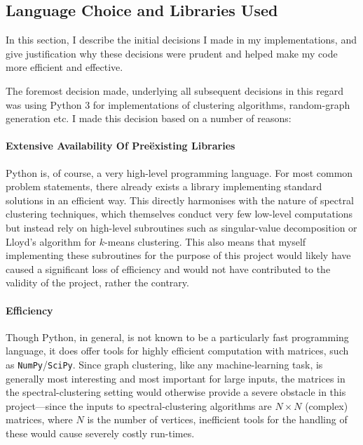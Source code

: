 \subsection{Language Choice and Libraries Used}

In this section, I describe the initial decisions I made in my implementations, and give justification why these decisions were prudent and helped make my code 
more efficient and effective.

The foremost decision made, underlying all subsequent decisions in this regard was using Python 3
for implementations of clustering algorithms, random-graph generation etc. I made this decision based on a number of reasons:

\paragraph{Extensive Availability Of Pre\"existing Libraries}
Python is, of course, a very high-level programming language. For most common problem statements, 
there already exists a library implementing standard solutions in an efficient way. This directly 
harmonises with the nature of spectral clustering techniques, which themselves conduct very few 
low-level computations but instead rely on high-level subroutines such as singular-value 
decomposition or Lloyd's algorithm for $k$-means clustering. This also means that myself 
implementing these subroutines for the purpose of this project would likely have caused a 
significant loss of efficiency and would not have contributed to the validity of the project, 
rather the contrary. 

\paragraph{Efficiency} 
Though Python, in general, is not known to be a particularly fast programming language, it does 
offer tools for highly efficient computation with matrices, such as \texttt{NumPy}/\texttt{SciPy}. Since graph 
clustering, like any machine-learning task, is generally most interesting and most important for 
large inputs, the matrices in the spectral-clustering setting would otherwise provide a severe 
obstacle in this project---since the inputs to spectral-clustering algorithms are $N\times N$ 
(complex) matrices, where $N$ is the number of vertices, inefficient tools for the handling of 
these would cause severely costly run-times. 

